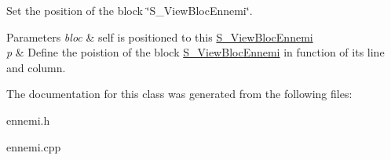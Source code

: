 Set the position of the block \char`\"{}\+S\+\_\+\+View\+Bloc\+Ennemi\char`\"{}. 


\begin{DoxyParams}{Parameters}
{\em bloc} & self is positioned to this \hyperlink{class_s___view_bloc_ennemi}{S\+\_\+\+View\+Bloc\+Ennemi} \\
\hline
{\em p} & Define the poistion of the block \hyperlink{class_s___view_bloc_ennemi}{S\+\_\+\+View\+Bloc\+Ennemi} in function of its line and column. \\
\hline
\end{DoxyParams}


The documentation for this class was generated from the following files\+:\begin{DoxyCompactItemize}
\item 
ennemi.\+h\item 
ennemi.\+cpp\end{DoxyCompactItemize}

